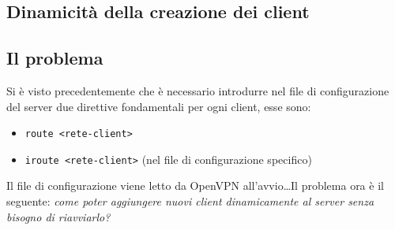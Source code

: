 \subsection{Dinamicità della creazione dei client}
\subsection{Il problema}
Si è visto precedentemente che è necessario introdurre nel file di configurazione del
server due direttive fondamentali per ogni client, esse sono:
\begin{itemize}
  \item \texttt{route <rete-client>}
  \item \texttt{iroute <rete-client>} (nel file di configurazione specifico)
\end{itemize}
Il file di configurazione viene letto da OpenVPN all'avvio\ldots Il problema ora
è il seguente: \textit{come poter aggiungere nuovi client dinamicamente al server
senza bisogno di riavviarlo?}
